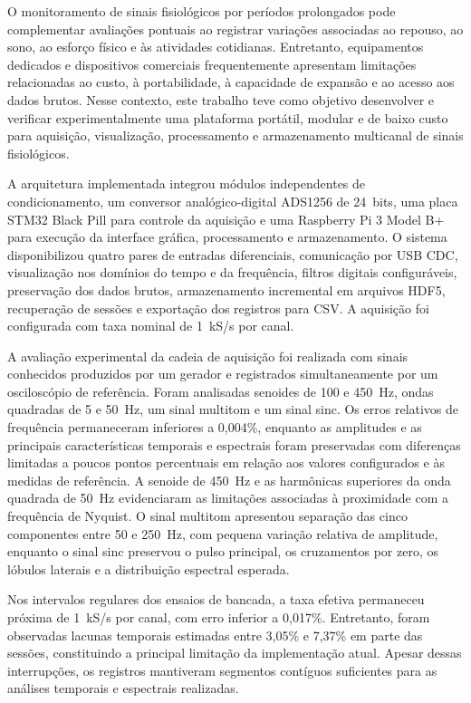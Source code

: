 \documentclass[a4paper,12pt]{fcte}
\begin{document}
\begin{resumo}

O monitoramento de sinais fisiológicos por períodos prolongados pode complementar avaliações pontuais ao registrar variações associadas ao repouso, ao sono, ao esforço físico e às atividades cotidianas. Entretanto, equipamentos dedicados e dispositivos comerciais frequentemente apresentam limitações relacionadas ao custo, à portabilidade, à capacidade de expansão e ao acesso aos dados brutos. Nesse contexto, este trabalho teve como objetivo desenvolver e verificar experimentalmente uma plataforma portátil, modular e de baixo custo para aquisição, visualização, processamento e armazenamento multicanal de sinais fisiológicos.

A arquitetura implementada integrou módulos independentes de condicionamento, um conversor analógico-digital ADS1256 de 24~bits, uma placa STM32 Black Pill para controle da aquisição e uma Raspberry Pi 3 Model B+ para execução da interface gráfica, processamento e armazenamento. O sistema disponibilizou quatro pares de entradas diferenciais, comunicação por USB CDC, visualização nos domínios do tempo e da frequência, filtros digitais configuráveis, preservação dos dados brutos, armazenamento incremental em arquivos HDF5, recuperação de sessões e exportação dos registros para CSV. A aquisição foi configurada com taxa nominal de 1~kS/s por canal.

A avaliação experimental da cadeia de aquisição foi realizada com sinais conhecidos produzidos por um gerador e registrados simultaneamente por um osciloscópio de referência. Foram analisadas senoides de 100 e 450~Hz, ondas quadradas de 5 e 50~Hz, um sinal multitom e um sinal sinc. Os erros relativos de frequência permaneceram inferiores a 0,004\%, enquanto as amplitudes e as principais características temporais e espectrais foram preservadas com diferenças limitadas a poucos pontos percentuais em relação aos valores configurados e às medidas de referência. A senoide de 450~Hz e as harmônicas superiores da onda quadrada de 50~Hz evidenciaram as limitações associadas à proximidade com a frequência de Nyquist. O sinal multitom apresentou separação das cinco componentes entre 50 e 250~Hz, com pequena variação relativa de amplitude, enquanto o sinal sinc preservou o pulso principal, os cruzamentos por zero, os lóbulos laterais e a distribuição espectral esperada.

Nos intervalos regulares dos ensaios de bancada, a taxa efetiva permaneceu próxima de 1~kS/s por canal, com erro inferior a 0,017\%. Entretanto, foram observadas lacunas temporais estimadas entre 3,05\% e 7,37\% em parte das sessões, constituindo a principal limitação da implementação atual. Apesar dessas interrupções, os registros mantiveram segmentos contíguos suficientes para as análises temporais e espectrais realizadas.


\end{resumo}
\end{document}
